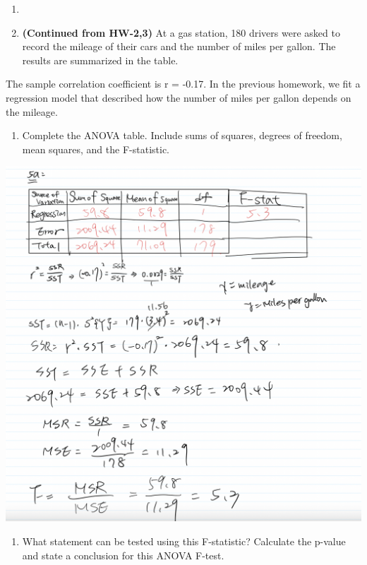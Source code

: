 \documentclass[
]{article}
\providecommand{\tightlist}{%
  \setlength{\itemsep}{0pt}\setlength{\parskip}{0pt}}
\begin{document}
\begin{enumerate}
\def\labelenumi{\arabic{enumi}.}
\setcounter{enumi}{3}
\item
\item
  \textbf{(Continued from HW-2,3)} At a gas station, 180 drivers were
  asked to record the mileage of their cars and the number of miles per
  gallon. The results are summarized in the table.
\end{enumerate}

The sample correlation coefficient is r = -0.17. In the previous
homework, we fit a regression model that described how the number of
miles per gallon depends on the mileage.

\begin{enumerate}
\def\labelenumi{(\alph{enumi})}
\tightlist
\item
  Complete the ANOVA table. Include sums of squares, degrees of freedom,
  mean squares, and the F-statistic.
\end{enumerate}

\includegraphics{pics/Screen Shot 2021-02-21 at 4.24.38 PM.png}

\begin{enumerate}
\def\labelenumi{(\alph{enumi})}
\setcounter{enumi}{1}
\tightlist
\item
  What statement can be tested using this F-statistic? Calculate the
  p-value and state a conclusion for this ANOVA F-test.
\end{enumerate}
\end{document}
